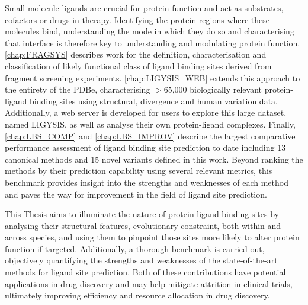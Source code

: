 Small molecule ligands are crucial for protein function and act as substrates, cofactors or drugs in therapy. Identifying the protein regions where these molecules bind, understanding the mode in which they do so and characterising that interface is therefore key to understanding and modulating protein function. \autoref{chap:FRAGSYS} describes work for the definition, characterisation and classification of likely functional class of ligand binding sites derived from fragment screening experiments. \autoref{chap:LIGYSIS_WEB} extends this approach to the entirety of the PDBe, characterising $>$65,000 biologically relevant protein-ligand binding sites using structural, divergence and human variation data. Additionally, a web server is developed for users to explore this large dataset, named LIGYSIS, as well as analyse their own protein-ligand complexes. Finally, \autoref{chap:LBS_COMP} and \autoref{chap:LBS_IMPROV} describe the largest comparative performance assessment of ligand binding site prediction to date including 13 canonical methods and 15 novel variants defined in this work. Beyond ranking the methods by their prediction capability using several relevant metrics, this benchmark provides insight into the strengths and weaknesses of each method and paves the way for improvement in the field of ligand site prediction.

This Thesis aims to illuminate the nature of protein-ligand binding sites by analysing their structural features, evolutionary constraint, both within and across species, and using them to pinpoint those sites more likely to alter protein function if targeted. Additionally, a thorough benchmark is carried out, objectively quantifying the strengths and weaknesses of the state-of-the-art methods for ligand site prediction. Both of these contributions have potential applications in drug discovery and may help mitigate attrition in clinical trials, ultimately improving efficiency and resource allocation in drug discovery.
